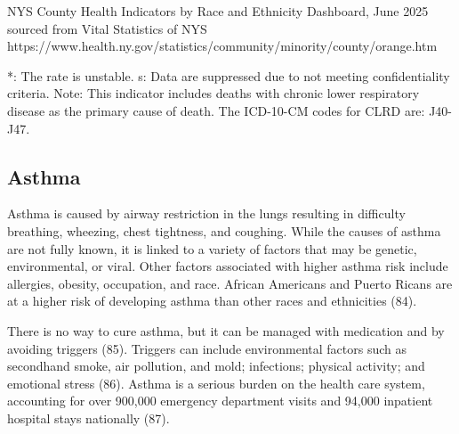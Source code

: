 \documentclass[
  english,
  letterpaper,
]{report}
\begin{document}
\begin{tcolorbox}[enhanced jigsaw, breakable, leftrule=.75mm, title=\textcolor{quarto-callout-note-color}{\faInfo}\hspace{0.5em}{Source}, bottomrule=.15mm, opacityback=0, left=2mm, colback=white, bottomtitle=1mm, coltitle=black, colbacktitle=quarto-callout-note-color!10!white, colframe=quarto-callout-note-color-frame, opacitybacktitle=0.6, toptitle=1mm, titlerule=0mm, arc=.35mm, rightrule=.15mm, toprule=.15mm]

NYS County Health Indicators by Race and Ethnicity Dashboard, June 2025
sourced from Vital Statistics of NYS
https://www.health.ny.gov/statistics/community/minority/county/orange.htm

\end{tcolorbox}

\begin{tcolorbox}[enhanced jigsaw, breakable, leftrule=.75mm, title=\textcolor{quarto-callout-note-color}{\faInfo}\hspace{0.5em}{Note}, bottomrule=.15mm, opacityback=0, left=2mm, colback=white, bottomtitle=1mm, coltitle=black, colbacktitle=quarto-callout-note-color!10!white, colframe=quarto-callout-note-color-frame, opacitybacktitle=0.6, toptitle=1mm, titlerule=0mm, arc=.35mm, rightrule=.15mm, toprule=.15mm]

*: The rate is unstable. s: Data are suppressed due to not meeting
confidentiality criteria. Note: This indicator includes deaths with
chronic lower respiratory disease as the primary cause of death. The
ICD-10-CM codes for CLRD are: J40-J47.

\end{tcolorbox}

\subsection{Asthma}\label{asthma}

Asthma is caused by airway restriction in the lungs resulting in
difficulty breathing, wheezing, chest tightness, and coughing. While the
causes of asthma are not fully known, it is linked to a variety of
factors that may be genetic, environmental, or viral. Other factors
associated with higher asthma risk include allergies, obesity,
occupation, and race. African Americans and Puerto Ricans are at a
higher risk of developing asthma than other races and ethnicities (84).

There is no way to cure asthma, but it can be managed with medication
and by avoiding triggers (85). Triggers can include environmental
factors such as secondhand smoke, air pollution, and mold; infections;
physical activity; and emotional stress (86). Asthma is a serious burden
on the health care system, accounting for over 900,000 emergency
department visits and 94,000 inpatient hospital stays nationally (87).
\end{document}
